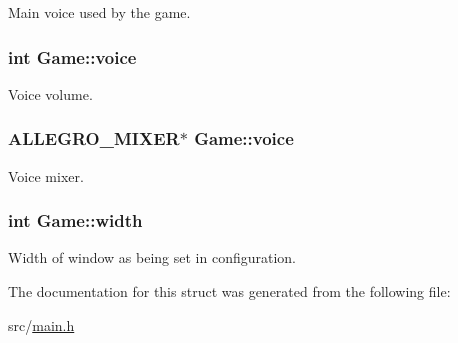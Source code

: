 Main voice used by the game. \hypertarget{structGame_a5523ac4fdb8fdbd2e86b58a3fbc2e6d0}{
\subsubsection[{voice}]{\setlength{\rightskip}{0pt plus 5cm}int Game\-::voice}}\label{structGame_a5523ac4fdb8fdbd2e86b58a3fbc2e6d0}
Voice volume. \hypertarget{structGame_acc651129cb9fafedf0588e229827c543}{
\subsubsection[{voice}]{\setlength{\rightskip}{0pt plus 5cm}A\-L\-L\-E\-G\-R\-O\-\_\-\-M\-I\-X\-E\-R$\ast$ Game\-::voice}}\label{structGame_acc651129cb9fafedf0588e229827c543}
Voice mixer. \hypertarget{structGame_a06b5a675d7c0f6a9b58d395872b1a4e7}{
\subsubsection[{width}]{\setlength{\rightskip}{0pt plus 5cm}int Game\-::width}}\label{structGame_a06b5a675d7c0f6a9b58d395872b1a4e7}
Width of window as being set in configuration. 

The documentation for this struct was generated from the following file\-:\begin{DoxyCompactItemize}
\item 
src/\hyperlink{main_8h}{main.\-h}\end{DoxyCompactItemize}
